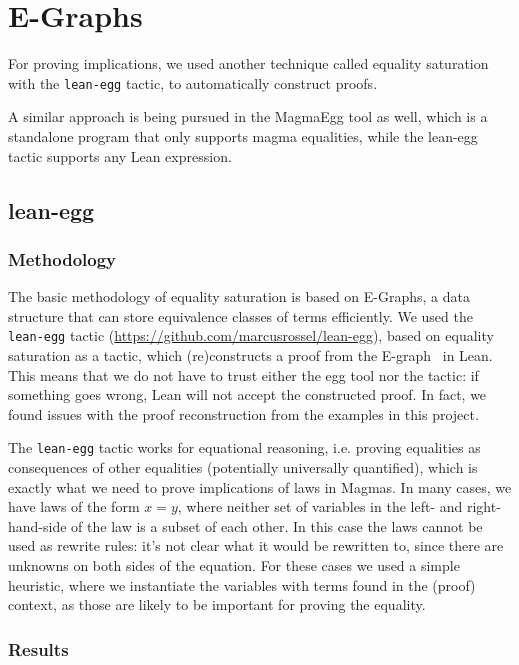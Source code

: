 \chapter{E-Graphs}\label{egraphs-chapter}

For proving implications, we used another technique called equality saturation~\cite{DBLP:journals/pacmpl/WillseyNWFTP21} with the \texttt{lean-egg} tactic, to automatically construct proofs.

A similar approach is being pursued in the MagmaEgg tool as well, which is a standalone program that only supports magma equalities, while the lean-egg tactic supports any Lean expression.

\section{lean-egg}

\subsection{Methodology}

The basic methodology of equality saturation is based on E-Graphs, a data structure that can store equivalence classes of terms efficiently.
We used the \texttt{lean-egg} tactic (\url{https://github.com/marcusrossel/lean-egg}), based on equality saturation as a tactic, which (re)constructs a proof from the E-graph~\cite{DBLP:journals/pacmpl/KoehlerGBGTS24} in Lean.
This means that we do not have to trust either the egg tool nor the tactic: if something goes wrong, Lean will not accept the constructed proof. In fact, we found issues with the proof reconstruction from the examples in this project.

The \texttt{lean-egg} tactic works for equational reasoning, i.e. proving equalities as consequences of other equalities (potentially universally quantified), which is exactly what we need to prove implications of laws in Magmas.
In many cases, we have laws of the form $x = y$, where neither set of variables in the left- and right-hand-side of the law is a subset of each other.
In this case the laws cannot be used as rewrite rules: it's not clear what it would be rewritten to, since there are unknowns on both sides of the equation.
For these cases we used a simple heuristic, where we instantiate the variables with terms found in the (proof) context, as those are likely to be important for proving the equality.

\subsection{Results}

